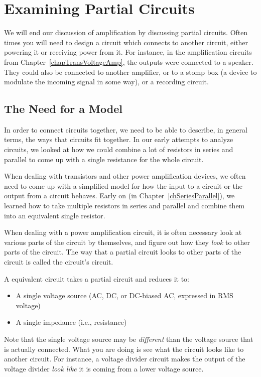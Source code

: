 \chapter{Examining Partial Circuits}

We will end our discussion of amplification by discussing partial circuits.
Often times you will need to design a circuit which connects to another circuit, either powering it or receiving power from it.
For instance, in the amplification circuits from Chapter~\ref{chapTransVoltageAmp}, the outputs were connected to a speaker.
They could also be connected to another amplifier, or to a stomp box (a device to modulate the incoming signal in some way), or a recording circuit.


\section{The Need for a Model}

In order to connect circuits together, we need to be able to describe, in general terms, the ways that circuits fit together.
In our early attempts to analyze circuits, we looked at how we could combine a lot of resistors in series and parallel to come up with a single resistance for the whole circuit.

When dealing with transistors and other power amplification devices, we often need to come up with a simplified model for how the input to a circuit or the output from a circuit behaves.
Early on (in Chapter~\ref{chSeriesParallel}), we learned how to take multiple resistors in series and parallel and combine them into an equivalent single resistor.

When dealing with a power amplification circuit, it is often necessary look at various parts of the circuit by themselves, and figure out how they \emph{look} to other parts of the circuit.
The way that a partial circuit looks to other parts of the circuit is called the circuit's  circuit.

A \thev equivalent circuit takes a partial circuit and reduces it to:
\begin{itemize}
\item A single voltage source (AC, DC, or DC-biased AC, expressed in RMS voltage)
\item A single impedance (i.e., resistance)
\end{itemize}

Note that the single voltage source may be \emph{different} than the voltage source that is actually connected.
What you are doing is see what the circuit looks like to another circuit.
For instance, a voltage divider circuit makes the output of the voltage divider \emph{look like} it is coming from a lower voltage source.

